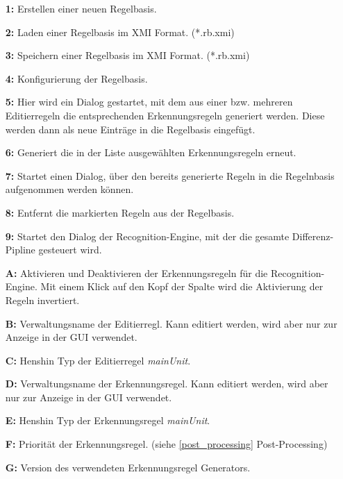 \begin{itemize}
  \item[\textbf{1:}] Erstellen einer neuen Regelbasis.
  \item[\textbf{2:}] Laden einer Regelbasis im XMI Format. (*.rb.xmi)
  \item[\textbf{3:}] Speichern einer Regelbasis im XMI Format. (*.rb.xmi)
  \item[\textbf{4:}] Konfigurierung der Regelbasis.
  \item[\textbf{5:}] Hier wird ein Dialog gestartet, mit dem aus einer bzw. mehreren Editierregeln
  die entsprechenden Erkennungsregeln generiert werden. Diese werden dann als neue Einträge in die
  Regelbasis eingefügt.
  \item[\textbf{6:}] Generiert die in der Liste ausgewählten Erkennungsregeln erneut.
  \item[\textbf{7:}] Startet einen Dialog, über den bereits generierte Regeln in die Regelnbasis
  aufgenommen werden können.
  \item[\textbf{8:}] Entfernt die markierten Regeln aus der Regelbasis.
  \item[\textbf{9:}] Startet den Dialog der Recognition-Engine, mit der die gesamte
  Differenz-Pipline gesteuert wird.
  \item[\textbf{A:}] Aktivieren und Deaktivieren der Erkennungsregeln für die Recognition-Engine.
  Mit einem Klick auf den Kopf der Spalte wird die Aktivierung der Regeln invertiert.
  \item[\textbf{B:}] Verwaltungsname der Editierregl. Kann editiert werden, wird aber nur zur
  Anzeige in der GUI verwendet.
  \item[\textbf{C:}] Henshin Typ der Editierregel \textit{mainUnit}.
  \item[\textbf{D:}] Verwaltungsname der Erkennungsregel. Kann editiert werden, wird aber nur zur
  Anzeige in der GUI verwendet.
  \item[\textbf{E:}] Henshin Typ der Erkennungsregel \textit{mainUnit}.
  \item[\textbf{F:}] Priorität der Erkennungsregel. (siehe \ref{post_processing} Post-Processing)
  \item[\textbf{G:}] Version des verwendeten Erkennungsregel Generators.
\end{itemize}

